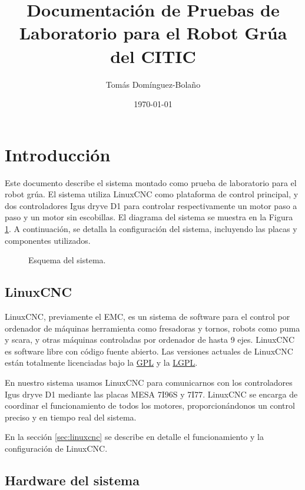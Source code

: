 \documentclass[english,spanish,a4paper,11pt]{article}
\title{Documentación de Pruebas de Laboratorio para el Robot Grúa del CITIC}
\author{Tomás Domínguez-Bolaño}
\affil{Centro de Investigación TIC (CITIC) \& Departamento de 
Ingeniería de Computadores, Universidade da Coruña, 15071, A Coruña, España}
\date{\today}
\begin{document}
\maketitle

\tableofcontents


\section{Introducción}

Este documento describe el sistema montado como prueba de laboratorio para el robot grúa. El sistema utiliza LinuxCNC como plataforma de control principal, y dos controladores Igus dryve D1 para controlar respectivamente un motor paso a paso y un motor sin escobillas. El diagrama del sistema se muestra en la Figura \ref{fig:system_diagram}. A continuación, se detalla la configuración del sistema, incluyendo las placas y componentes utilizados.

\begin{figure}[!ht]
    \centering
    \makebox[\textwidth]{
        
    }
    \caption{Esquema del sistema.}
    \label{fig:system_diagram}
\end{figure}


\subsection{LinuxCNC}

LinuxCNC, previamente el \acf{EMC}, es un sistema de software para el control por ordenador de máquinas herramienta como fresadoras y tornos, robots como puma y scara, y otras máquinas controladas por ordenador de hasta 9 ejes. LinuxCNC es software libre con código fuente abierto. Las versiones actuales de LinuxCNC están totalmente licenciadas bajo la \href{https://www.gnu.org/licenses/gpl.html}{\ac{GPL}} y la \href{https://gnu.org/licenses/lgpl.html}{\ac{LGPL}}.

En nuestro sistema usamos LinuxCNC para comunicarnos con los controladores Igus dryve D1 mediante las placas MESA 7I96S y 7I77. LinuxCNC se encarga de coordinar el funcionamiento de todos los motores, proporcionándonos un control preciso y en tiempo real del sistema.

En la sección \cref{sec:linuxcnc} se describe en detalle el funcionamiento y la configuración de LinuxCNC.


\subsection{Hardware del sistema}
\end{document}
